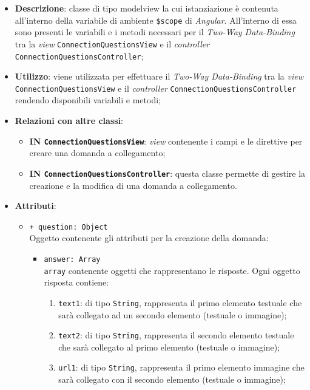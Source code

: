 \begin{itemize}
	\item \textbf{Descrizione}: classe di tipo modelview la cui istanziazione è contenuta all'interno della variabile di ambiente \texttt{\$scope} di \textit{Angular}. All'interno di essa sono presenti le variabili e i metodi necessari per il \textit{Two-Way Data-Binding} tra la \textit{view} \texttt{ConnectionQuestionsView} e il \textit{controller} \texttt{ConnectionQuestionsController}; 
	\item \textbf{Utilizzo}: viene utilizzata per effettuare il \textit{Two-Way Data-Binding} tra la \textit{view}\\ \texttt{ConnectionQuestionsView} e il \textit{controller} \texttt{ConnectionQuestionsController} rendendo disponibili variabili e metodi;
	\item \textbf{Relazioni con altre classi}:
	\begin{itemize}
		\item \textbf{IN \texttt{ConnectionQuestionsView}}: \textit{view} contenente i campi e le direttive per creare una domanda a collegamento; 
		\item \textbf{IN \texttt{ConnectionQuestionsController}}: questa classe permette di gestire la creazione e la modifica di una domanda a collegamento.
	\end{itemize}
	\item \textbf{Attributi}:
	\begin{itemize}
		\item \texttt{+ question: Object} \\ Oggetto contenente gli attributi per la creazione della domanda:
		\begin{itemize}
			\item \texttt{answer: Array} \\ \texttt{array} contenente oggetti che rappresentano le risposte. Ogni oggetto risposta contiene:
			\begin{enumerate}
				\item \texttt{text1}: di tipo \texttt{String}, rappresenta il primo elemento testuale che sarà collegato ad un secondo elemento (testuale o immagine);
				\item \texttt{text2}:  di tipo \texttt{String}, rappresenta il secondo elemento testuale che sarà collegato al primo elemento (testuale o immagine);
				\item \texttt{url1}: di tipo \texttt{String}, rappresenta il primo elemento immagine che sarà collegato con il secondo elemento (testuale o immagine);

\end{enumerate}
\end{itemize}
\end{itemize}
\end{itemize}

